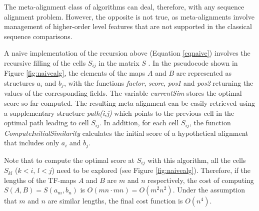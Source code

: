 The meta-alignment class of algorithms can deal, therefore, with any sequence alignment problem.
However, the opposite is not true, as meta-alignments involve management of higher-order level
features that are not supported in the classical sequence comparisons.


 
A naive implementation of the recursion above (Equation \ref{eqnaive}) involves
the recursive filling of the cells $S_{ij}$ in the matrix $S$ \citep{waterman:1984c}. 
In the pseudocode shown in Figure \ref{fig:naivealg}, the elements of the maps $A$ and $B$ are represented as 
structures $a_i$ and $b_j$, with the functions \emph{factor}, \emph{score}, \emph{pos1} 
and \emph{pos2} returning the values of the corresponding fields. The variable 
\emph{currentSim} stores the optimal score so far computed. The resulting meta-alignment 
can be easily retrieved using a supplementary structure \emph{path(i,j)} which points to 
the previous cell in the optimal path leading to cell $S_{ij}$. In addition, for each 
cell $S_{ij}$, the function \emph{ComputeInitialSimilarity} calculates the initial score of 
a hypothetical alignment that includes only $a_i$ and $b_j$.

Note that to compute the optimal score at $S_{ij}$ with this algorithm, 
all the cells $S_{kl}$ ($k<i$, $l<j$) need to be explored (see Figure \ref{fig:naivealg}). 
Therefore, if the lengths of the TF-maps $A$ and $B$ are $m$ and $n$ respectively, the 
cost of computing $S(A,B)=S(a_m,b_n)$ is $O(mn \cdot mn) = O(m^2n^2)$. 
Under the assumption that $m$ and $n$ are similar lengths, the final cost 
function is $O(n^4)$.


